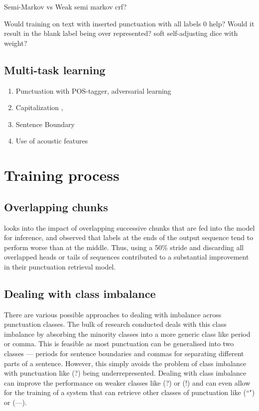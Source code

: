 \documentclass[a4paper]{article}
\begin{document}
\begin{multicols}{2}
Semi-Markov vs Weak semi markov crf?

Would training on text with inserted punctuation with all labels 0 help? Would it result in the blank label being over represented? soft self-adjusting dice with weight?

\subsection{Multi-task learning}
\begin{enumerate}
\item Punctuation with POS-tagger, adversarial learning \citep{adversarial}

\item Capitalization \citep{jointlearningcorrbirnn}, \citep{chunkmerging}

\item Sentence Boundary \cite{dynamiccrf}

\item Use of acoustic features
\end{enumerate}

\section{Training process}
\subsection{Overlapping chunks}
\citet{chunkmerging} looks into the impact of overlapping successive chunks that are fed into the model for inference, and observed that labels at the ends of the output sequence tend to perform worse than at the middle. Thus, using a 50\% stride and discarding all overlapped heads or tails of sequences contributed to a substantial improvement in their punctuation retrieval model.
\subsection{Dealing with class imbalance}
There are various possible approaches to dealing with imbalance across punctuation classes. The bulk of research conducted deals with this class imbalance by absorbing the minority classes into a more generic class like period or comma. This is feasible as most punctuation can be generalised into two classes --- periods for sentence boundaries and commas for separating different parts of a sentence. However, this simply avoids the problem of class imbalance with punctuation like (?) being underrepresented. Dealing with class imbalance can improve the performance on weaker classes like (?) or (!) and can even allow for the training of a system that can retrieve other classes of punctuation like (``") or (---). 

\end{multicols}
\end{document}

